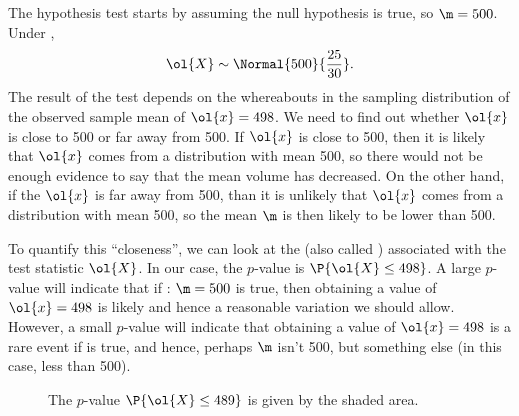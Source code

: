 The hypothesis test starts by assuming the null hypothesis is true, so $\m = 500$. Under \nullhyp, \[\ol{X} \sim \Normal{500}{\frac{25}{30}}.\] The result of the test depends on the whereabouts in the sampling distribution of the observed sample mean of $\ol{x} = 498$. We need to find out whether $\ol{x}$ is close to 500 or far away from 500. If $\ol{x}$ is close to 500, then it is likely that $\ol{x}$ comes from a distribution with mean 500, so there would not be enough evidence to say that the mean volume has decreased. On the other hand, if the $\ol{x}$ is far away from 500, than it is unlikely that $\ol{x}$ comes from a distribution with mean 500, so the mean $\m$ is then likely to be lower than 500.

To quantify this ``closeness'', we can look at the  (also called ) associated with the test statistic $\ol{X}$. In our case, the $p$-value is $\P{\ol{X} \leq 498}$. A large $p$-value will indicate that if \nullhyp: $\m = 500$ is true, then obtaining a value of $\ol{x} = 498$ is likely and hence a reasonable variation we should allow. However, a small $p$-value will indicate that obtaining a value of $\ol{x} = 498$ is a rare event if \nullhyp{} is true, and hence, perhaps $\m $ isn't 500, but something else (in this case, less than 500).

\begin{figure}[H]
    \centering
    \caption{The $p$-value $\P{\ol{X} \leq 489}$ is given by the shaded area.}
\end{figure}

